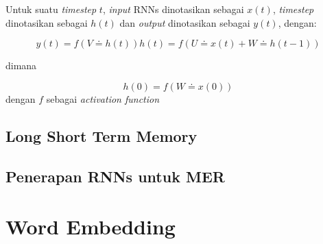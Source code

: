 Untuk suatu \textit{timestep} $ t $, \textit{input} RNNs dinotasikan sebagai $ x(t) $, \textit{timestep} dinotasikan sebagai $ h(t) $ dan \textit{output} dinotasikan sebagai $ y(t) $, dengan:

\begin{equation}
y(t) = f(V \doteq h(t))
h(t) = f(U \doteq x(t) + W \doteq h(t-1))
\end{equation}

dimana

\begin{equation}
h(0) = f(W \doteq x(0))
\end{equation}
dengan $ f $ sebagai \textit{activation function}

\subsection{Long Short Term Memory}
\subsection{Penerapan RNNs untuk MER}

\section{Word Embedding}
